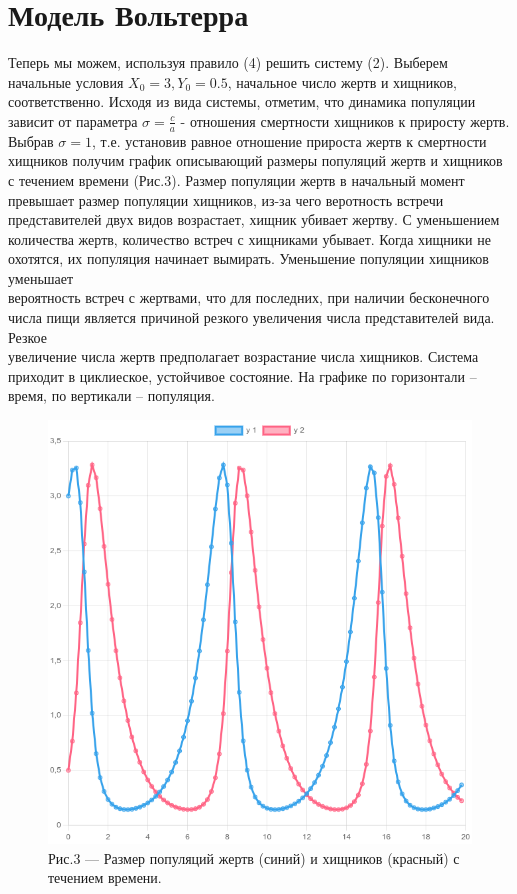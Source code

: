 \documentclass[a4paper,12pt]{article}
\begin{document}
\section{Модель Вольтерра}
\hspace{0.5cm} Теперь мы можем, используя правило (4) решить систему (2). Выберем начальные условия
$X_0 = 3, Y_0 = 0.5$, начальное число жертв и хищников, соответственно. Исходя из вида системы, отметим, что
динамика популяции зависит от параметра $\sigma = \frac{c}{a}$ - отношения смертности хищников к приросту жертв.
Выбрав $\sigma = 1$, т.е. установив равное отношение прироста жертв к смертности хищников получим график 
описывающий размеры популяций жертв и хищников с течением времени (Рис.3). Размер популяции жертв 
в начальный момент превышает размер популяции хищников, из-за чего веротность встречи представителей двух
видов возрастает, хищник убивает жертву. С уменьшением количества жертв, количество встреч 
с хищниками убывает. Когда хищники не охотятся, их популяция начинает вымирать. Уменьшение популяции хищников уменьшает \\
вероятность встреч с жертвами, что для последних, при наличии бесконечного числа пищи 
является причиной резкого увеличения числа представителей вида. Резкое \\
увеличение числа жертв предполагает возрастание числа хищников. Система приходит в циклиеское, устойчивое состояние. 
На графике по горизонтали -- время, по вертикали -- популяция.
\begin{figure}[h]
    \centering
    \includegraphics[width=0.5\linewidth]{pictures/task1.png}
    \captionsetup{labelformat=empty}
    \caption{Рис.3 --- Размер популяций жертв (синий) и хищников (красный) с течением времени.}
\end{figure}
\newpage
\end{document}

